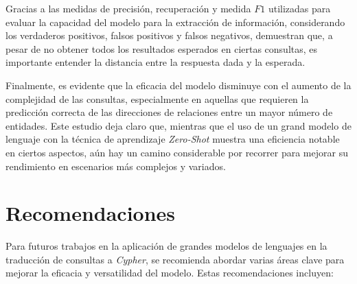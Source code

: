 Gracias a las medidas de precisión, recuperación y medida $F1$ utilizadas para evaluar la capacidad del modelo para la extracción de información, considerando los verdaderos positivos, falsos positivos y falsos negativos, demuestran que, a pesar de no obtener todos los resultados esperados en ciertas consultas, es importante entender la distancia entre la respuesta dada y la esperada.

Finalmente, es evidente que la eficacia del modelo disminuye con el aumento de la complejidad de las consultas, especialmente en aquellas que requieren la predicción correcta de las direcciones de relaciones entre un mayor número de entidades. Este estudio deja claro que, mientras que el uso de un grand modelo de lenguaje con la técnica de aprendizaje \textit{Zero-Shot} muestra una eficiencia notable en ciertos aspectos, aún hay un camino considerable por recorrer para mejorar su rendimiento en escenarios más complejos y variados.

\chapter*{Recomendaciones}\label{chapter:conclusions}
Para futuros trabajos en la aplicación de grandes modelos de lenguajes en la traducción de consultas a \textit{Cypher}, se recomienda abordar varias áreas clave para mejorar la eficacia y versatilidad del modelo. Estas recomendaciones incluyen:

